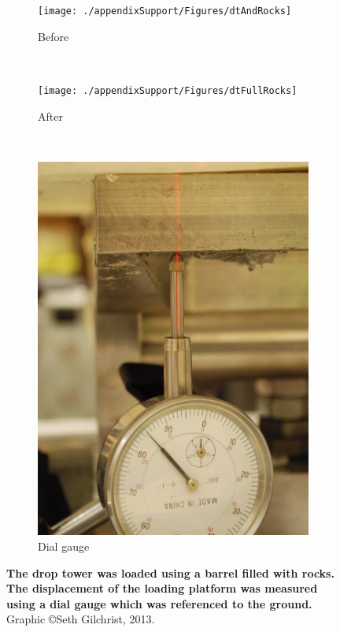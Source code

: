 \begin{figure}
\centering
\begin{subfigure}[b]{0.3\textwidth}
\texttt{[image: ./appendixSupport/Figures/dtAndRocks]}
\caption{Before}
\label{fig:dtCompBefore}
\end{subfigure}
~
\begin{subfigure}[b]{0.3\textwidth}
\texttt{[image: ./appendixSupport/Figures/dtFullRocks]}
\caption{After}
\label{fig:dtCompAfter}
\end{subfigure}
~
\begin{subfigure}[b]{0.3\textwidth}
\includegraphics[width=\textwidth]{./appendixSupport/Figures/dtDialGauge}
\caption{Dial gauge}
\label{fig:dtCompDialGauge}
\end{subfigure}
\caption[Drop tower compliance test]{\textbf{The drop tower was loaded using a barrel filled with rocks. The displacement of the loading platform was measured using a dial gauge which was referenced to the ground.} Graphic \copyright Seth Gilchrist, 2013.}
\label{fig:dtCompliance}
\end{figure}


